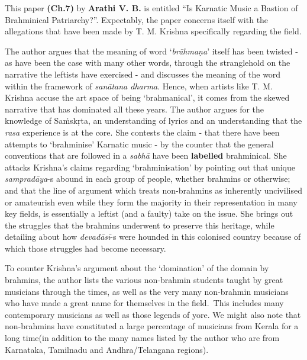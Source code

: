 \vspace{-.1cm}

This paper \textbf{(Ch.7)} by \textbf{Arathi V. B.} is entitled “Is Karnatic Music a Bastion of Brahminical Patriarchy?”. Expectably, the paper concerns itself with the allegations that have been made by T. M. Krishna specifically regarding the field.

\vspace{-.1cm}

The author argues that the meaning of word ‘\textit{brāhmaṇa}’ itself has been twisted - as have been the case with many other words, through the stranglehold on the narrative the leftists have exercised - and discusses the meaning of the word within the framework of \textit{sanātana dharma}. Hence, when artists like T. M. Krishna accuse the art space of being ‘brahmanical’, it comes from the skewed narrative that has dominated all these years. The author argues for the knowledge of Saṁskṛta, an understanding of lyrics and an understanding that the \textit{rasa} experience is at the core. She contests the claim - that there have been attempts to ‘brahminise’ Karnatic music - by the counter that the general conventions that are followed in a \textit{sabhā} have been \textbf{labelled} brahminical. She attacks Krishna’s claims regarding ‘brahminisation’ by pointing out that unique \textit{sampradāya}-s abound in each group of people, whether brahmins or otherwise; and that the line of argument which treats non-brahmins as inherently uncivilised or amateurish even while they form the majority in their representation in many key fields, is essentially a leftist (and a faulty) take on the issue. She brings out the struggles that the brahmins underwent to preserve this heritage, while detailing about how \textit{devadāsī}-s were hounded in this colonised country because of which those struggles had become necessary.

\vspace{-.1cm}

To counter Krishna’s argument about the ‘domination’ of the domain by brahmins, the author lists the various non-brahmin students taught by great musicians through the times, as well as the very many non-brahmin musicians who have made a great name for themselves in the field.~This includes many contemporary musicians as well as those legends of yore. We might also note that non-brahmins have constituted a large percentage of musicians from Kerala for a long time(in addition to the many names listed by the author who are from Karnataka, Tamilnadu and Andhra/Telangana regions).

